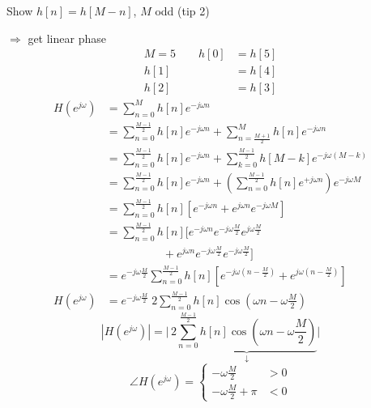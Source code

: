 \documentclass[11pt,a4paper]{article}
\begin{document}
Show $h[n] = h[M-n]$, $M$ odd \hfill (tip 2)

$\Rightarrow$ get linear phase
\begin{align*}
M = 5 \qquad h[0] &= h[5]\\
h[1] &= h[4]\\
h[2] &= h[3]
\end{align*}
\begin{align*}
H(e^{j\omega}) &= \sum_{n=0}^{M} h[n]e^{-j\omega n}\\
&= \sum_{n=0}^{\frac{M-1}{2}} h[n]e^{-j\omega n} + \sum_{n=\frac{M+1}{2}}^{M} h[n]e^{-j\omega n}\\
&= \sum_{n=0}^{\frac{M-1}{2}} h[n]e^{-j\omega n} + \sum_{k=0}^{\frac{M-1}{2}} h[M-k]e^{-j\omega(M-k)}\\
&= \sum_{n=0}^{\frac{M-1}{2}} h[n]e^{-j\omega n} + \left(\sum_{n=0}^{\frac{M-1}{2}} h[n]e^{+j\omega n}\right)e^{-j\omega M}\\
&= \sum_{n=0}^{\frac{M-1}{2}} h[n]\left[e^{-j\omega n} + e^{j\omega n}e^{-j\omega M}\right]\\
&= \sum_{n=0}^{\frac{M-1}{2}} h[n]\Big[e^{-j\omega n}e^{-j\omega\frac{M}{2}}e^{j\omega\frac{M}{2}}\\
&\qquad\qquad\quad + e^{j\omega n}e^{-j\omega\frac{M}{2}}e^{-j\omega\frac{M}{2}}\Big]\\
&= e^{-j\omega\frac{M}{2}}\sum_{n=0}^{\frac{M-1}{2}} h[n]\left[e^{-j\omega(n-\frac{M}{2})} + e^{j\omega(n-\frac{M}{2})}\right]\\
H(e^{j\omega}) &= e^{-j\omega\frac{M}{2}}\; 2\sum_{n=0}^{\frac{M-1}{2}} h[n]\cos\left(\omega n - \omega\frac{M}{2}\right)
\end{align*}
\[ |H(e^{j\omega})| = \Big|\,2\underbrace{\sum_{n=0}^{\frac{M-1}{2}} h[n]\cos\left(\omega n - \omega\frac{M}{2}\right)}_{\downarrow}\Big| \]
\[ \angle H(e^{j\omega}) = \begin{cases} -\omega\frac{M}{2} & > 0\\[2pt] -\omega\frac{M}{2} + \pi & < 0 \end{cases} \]
\end{document}
